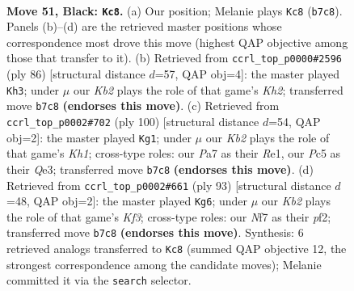 \documentclass[11pt]{article}
\begin{document}
\clearpage

\begin{figure}[p]\centering
\begin{subfigure}{0.46\textwidth}\centering
\resizebox{\linewidth}{!}{%
\newchessgame
\chessboard[
  setfen={8/pkp2np1/1p4p1/2p2q2/8/2P5/1P6/K3Q3 b - - 3 51},
  showmover=false,
  pgfstyle=straightmove, color=movearrow, markmove={b7-c8}
]}
\caption{}
\end{subfigure}\hfill
\begin{subfigure}{0.46\textwidth}\centering
\resizebox{\linewidth}{!}{%
\newchessgame
\chessboard[
  setfen={8/4q2k/6p1/4p2p/4P2P/5P2/5QPK/8 w - - 13 44},
  showmover=false,
  pgfstyle=straightmove, color=movearrow, markmove={h2-h3}
]}
\caption{}
\end{subfigure}
\\[4pt]
\begin{subfigure}{0.46\textwidth}\centering
\resizebox{\linewidth}{!}{%
\newchessgame
\chessboard[
  setfen={6k1/1q3p2/3r2pp/8/5P2/4Q1P1/4P2P/4R2K w - - 1 51},
  showmover=false,
  pgfstyle=straightmove, color=movearrow, markmove={h1-g1}
]}
\caption{}
\end{subfigure}\hfill
\begin{subfigure}{0.46\textwidth}\centering
\resizebox{\linewidth}{!}{%
\newchessgame
\chessboard[
  setfen={8/5p2/4pk2/p2q2p1/P7/4P1P1/1Q3P1K/8 b - - 3 47},
  showmover=false,
  pgfstyle=straightmove, color=movearrow, markmove={f6-g6}
]}
\caption{}
\end{subfigure}
\caption{\textbf{Move 51, Black: \texttt{Kc8}.} (a) Our position; Melanie plays \texttt{Kc8} (\texttt{b7c8}). Panels (b)--(d) are the retrieved master positions whose correspondence most drove this move (highest QAP objective among those that transfer to it). (b) Retrieved from \texttt{ccrl\_top\_p0000\#2596} (ply 86) [structural distance $d$=57, QAP obj=4]: the master played \texttt{Kh3}; under $\mu$ our \emph{Kb2} plays the role of that game's \emph{Kh2}; transferred move \texttt{b7c8} \textbf{(endorses this move)}. (c) Retrieved from \texttt{ccrl\_top\_p0002\#702} (ply 100) [structural distance $d$=54, QAP obj=2]: the master played \texttt{Kg1}; under $\mu$ our \emph{Kb2} plays the role of that game's \emph{Kh1}; cross-type roles: our \emph{P}a7 as their \emph{R}e1, our \emph{P}c5 as their \emph{Q}e3; transferred move \texttt{b7c8} \textbf{(endorses this move)}. (d) Retrieved from \texttt{ccrl\_top\_p0002\#661} (ply 93) [structural distance $d$=48, QAP obj=2]: the master played \texttt{Kg6}; under $\mu$ our \emph{Kb2} plays the role of that game's \emph{Kf3}; cross-type roles: our \emph{N}f7 as their \emph{p}f2; transferred move \texttt{b7c8} \textbf{(endorses this move)}. Synthesis: 6 retrieved analogs transferred to \texttt{Kc8} (summed QAP objective 12, the strongest correspondence among the candidate moves); Melanie committed it via the \texttt{search} selector.}
\label{fig:thought-m101}
\end{figure}
\end{document}
